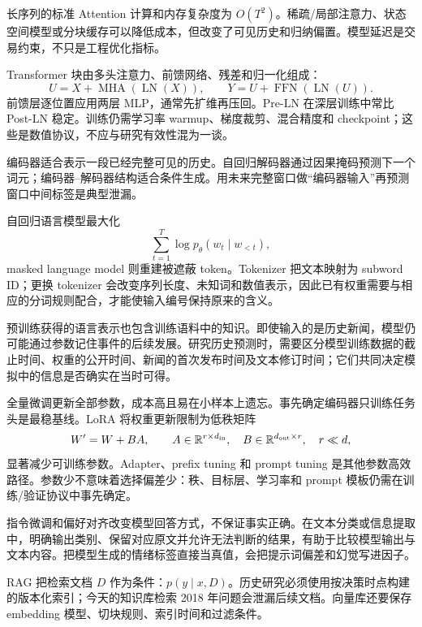 长序列的标准 Attention 计算和内存复杂度为 $O(T^2)$。稀疏/局部注意力、状态空间模型或分块缓存可以降低成本，但改变了可见历史和归纳偏置。模型延迟是交易约束，不只是工程优化指标。


Transformer 块由多头注意力、前馈网络、残差和归一化组成\cite{vaswani2017attention}：
\[
U=X+\operatorname{MHA}(\operatorname{LN}(X)),\qquad
Y=U+\operatorname{FFN}(\operatorname{LN}(U)).
\]
前馈层逐位置应用两层 MLP，通常先扩维再压回。Pre-LN 在深层训练中常比 Post-LN 稳定。训练仍需学习率 warmup、梯度裁剪、混合精度和 checkpoint；这些是数值协议，不应与研究有效性混为一谈。



编码器适合表示一段已经完整可见的历史。自回归解码器通过因果掩码预测下一个词元；编码器--解码器结构适合条件生成。用未来完整窗口做“编码器输入”再预测窗口中间标签是典型泄漏。


自回归语言模型最大化
\[
\sum_{t=1}^T\log p_\theta(w_t\mid w_{<t}),
\]
masked language model 则重建被遮蔽 token。Tokenizer 把文本映射为 subword ID；更换 tokenizer 会改变序列长度、未知词和数值表示，因此已有权重需要与相应的分词规则配合，才能使输入编号保持原来的含义。

预训练获得的语言表示也包含训练语料中的知识。即使输入的是历史新闻，模型仍可能通过参数记住事件的后续发展。研究历史预测时，需要区分模型训练数据的截止时间、权重的公开时间、新闻的首次发布时间及文本修订时间；它们共同决定模拟中的信息是否确实在当时可得。


全量微调更新全部参数，成本高且易在小样本上遗忘。事先确定编码器只训练任务头是最稳基线。LoRA 将权重更新限制为低秩矩阵
\[
W'=W+BA,\qquad A\in\mathbb R^{r\times d_{\rm in}},
\quad B\in\mathbb R^{d_{\rm out}\times r},\quad r\ll d,
\]
显著减少可训练参数\cite{hu2022lora}。Adapter、prefix tuning 和 prompt tuning 是其他参数高效路径。参数少不意味着选择偏差少：秩、目标层、学习率和 prompt 模板仍需在训练/验证协议中事先确定。

指令微调和偏好对齐改变模型回答方式，不保证事实正确。在文本分类或信息提取中，明确输出类别、保留对应原文并允许无法判断的结果，有助于比较模型输出与文本内容。把模型生成的情绪标签直接当真值，会把提示词偏差和幻觉写进因子。


RAG 把检索文档 $D$ 作为条件：$p(y\mid x,D)$。历史研究必须使用按决策时点构建的版本化索引；今天的知识库检索 2018 年问题会泄漏后续文档。向量库还要保存 embedding 模型、切块规则、索引时间和过滤条件。

